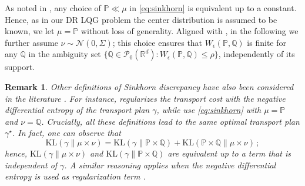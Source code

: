\documentclass[letterpaper, 10 pt, conference]{ieeeconf}  %
\theoremstyle{ieeeconf}
\newtheorem{remark}{Remark}
\newcommand{\Prob}{\mathbb{P}}
\newcommand{\Q}{\mathbb{Q}}
\newcommand{\dd}{\mathop{}\!\mathrm{d}}
\begin{document}
As noted in \cite[Remark 2]{sinkhorn}, any choice of $\Prob\ll\mu$ in \eqref{eq:sinkhorn} is equivalent up to a constant. Hence, as in our DR LQG problem the center distribution is assumed to be known, we let $\mu=\Prob$ without loss of generality. Aligned with \cite{sinkhorn, cescon2025data}, in the following we further assume $\nu\sim\mathcal{N}(0, \Sigma)$; this choice ensures that $W_{\epsilon}(\Prob, \Q)$ is finite for any $\Q$ in the ambiguity set $\{\Q \in \mathcal{P}_0(\mathbb{R}^d): W_\epsilon(\Prob, \Q) \leq \rho\}$, independently of its support.

\begin{remark}
\label{remark:equivalence}
    Other definitions of Sinkhorn discrepancy have also been considered in the literature \cite{del2020statistical, janati2020entropic, mallasto2022entropy}. For instance, \cite{del2020statistical} regularizes the transport cost with the negative differential entropy of the transport plan $\gamma$, while \cite{janati2020entropic, mallasto2022entropy} use \eqref{eq:sinkhorn} with $\mu=\Prob$ and $\nu=\Q$. Crucially, all these definitions lead to the same optimal transport plan $\gamma^\star$. In fact, one can observe that 
    \begin{equation*}
        \mathrm{KL}(\gamma\|\mu\times\nu) = \mathrm{KL}(\gamma\|\Prob\times\Q) + \mathrm{KL}(\Prob\times\Q\|\mu\times\nu)\,;
    \end{equation*}
    hence, $\mathrm{KL}(\gamma\|\mu\times\nu)$ and $\mathrm{KL}(\gamma\|\Prob\times\Q)$ are equivalent up to a term that is independent of $\gamma$. A similar reasoning applies when the negative differential entropy is used as regularization term \cite{del2020statistical}.   
\end{remark}


\end{document}
